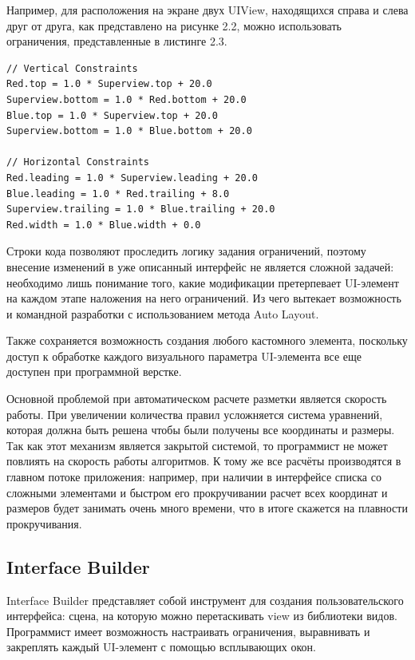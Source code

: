 Например, для расположения на экране двух UIView, находящихся справа и слева друг от друга, как представлено на рисунке 2.2, можно использовать ограничения, представленные в листинге 2.3.

\begin{lstlisting}[caption=Задание параметров view]
// Vertical Constraints
Red.top = 1.0 * Superview.top + 20.0
Superview.bottom = 1.0 * Red.bottom + 20.0
Blue.top = 1.0 * Superview.top + 20.0
Superview.bottom = 1.0 * Blue.bottom + 20.0
 
// Horizontal Constraints
Red.leading = 1.0 * Superview.leading + 20.0
Blue.leading = 1.0 * Red.trailing + 8.0
Superview.trailing = 1.0 * Blue.trailing + 20.0
Red.width = 1.0 * Blue.width + 0.0
\end{lstlisting}

Строки кода позволяют проследить логику задания ограничений, поэтому внесение изменений в уже описанный интерфейс не является сложной задачей: необходимо лишь понимание того, какие модификации претерпевает UI-элемент на каждом этапе наложения на него ограничений. Из чего вытекает возможность и командной разработки с использованием метода Auto Layout.

Также сохраняется возможность создания любого кастомного элемента, поскольку доступ к обработке каждого визуального параметра UI-элемента все еще доступен при программной верстке.

Основной проблемой при автоматическом расчете разметки является скорость работы. При увеличении
количества правил усложняется система уравнений, которая должна быть решена чтобы были получены все координаты и размеры. Так как этот механизм является закрытой системой, то программист не может повлиять на скорость работы алгоритмов. К тому же все расчёты производятся в главном потоке приложения: например, при наличии в интерфейсе списка со сложными элементами и быстром его прокручивании расчет всех координат и размеров будет занимать очень много времени, что в итоге скажется на плавности прокручивания.


\subsection{Interface Builder}

Interface Builder \cite{interfacebuilder} представляет собой инструмент для создания пользовательского интерфейса: сцена, на которую можно перетаскивать view из библиотеки видов. Программист имеет возможность настраивать ограничения, выравнивать и закреплять каждый UI-элемент с помощью всплывающих окон. 

